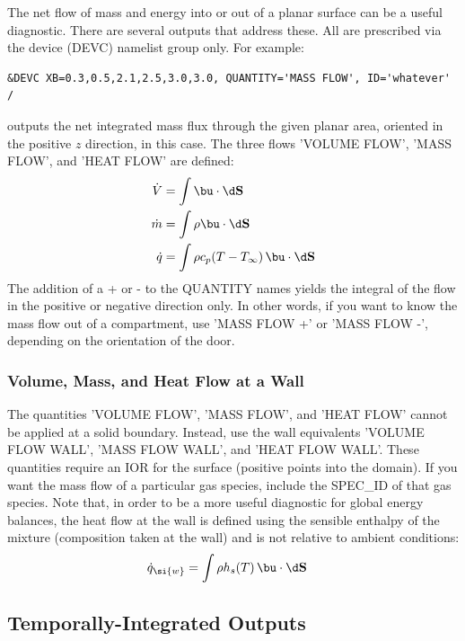 \documentclass[11pt]{book}
\begin{document}
The net flow of mass and energy into or out of a planar surface can be a useful diagnostic. There are several outputs that address these. All are prescribed via
the device ({\ct DEVC}) namelist group only. For example:

\begin{lstlisting}
&DEVC XB=0.3,0.5,2.1,2.5,3.0,3.0, QUANTITY='MASS FLOW', ID='whatever' /
\end{lstlisting}

\noindent
outputs the net integrated mass flux through the given planar area, oriented in the positive $z$ direction, in this case. The three flows {\ct 'VOLUME FLOW'}, {\ct 'MASS FLOW'},
and {\ct 'HEAT FLOW'} are defined:
\begin{align}
\dot{V} &= \int \bu \cdot \d \mathbf{S}  \\
\dot{m} &= \int \rho \bu \cdot \d \mathbf{S} \\
\dot{q} &= \int \rho c_p (T-T_\infty) \, \bu \cdot \d \mathbf{S}
\end{align}
The addition of a {\ct +} or {\ct -} to the {\ct QUANTITY} names yields the integral of the flow in the positive or negative direction only. In other words, if you want to know the mass flow out of a compartment, use {\ct 'MASS FLOW +'} or {\ct 'MASS FLOW -'}, depending on the orientation of the door.

\subsubsection{Volume, Mass, and Heat Flow at a Wall}
\label{info:wallflows}

The quantities {\ct 'VOLUME FLOW'}, {\ct 'MASS FLOW'}, and {\ct 'HEAT FLOW'} cannot be applied at a solid boundary.  Instead, use the wall equivalents {\ct 'VOLUME FLOW WALL'}, {\ct 'MASS FLOW WALL'}, and {\ct 'HEAT FLOW WALL'}.  These quantities require an {\ct IOR} for the surface (positive points into the domain).  If you want the mass flow of a particular gas species, include the {\ct SPEC\_ID} of that gas species. Note that, in order to be a more useful diagnostic for global energy balances, the heat flow at the wall is defined using the sensible enthalpy of the mixture (composition taken at the wall) and is not relative to ambient conditions:
\begin{align}
\dot{q}_{\si{w}} &= \int \rho h_s(T) \, \bu \cdot \d \mathbf{S}
\end{align}

\subsection{Temporally-Integrated Outputs}
\label{info:time_integral}
\end{document}
